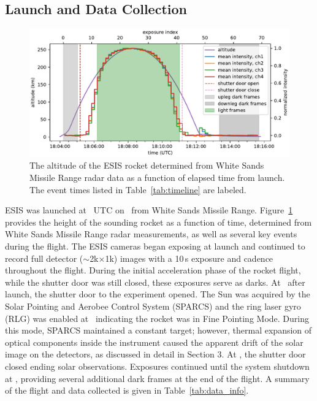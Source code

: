 	\subsection{Launch and Data Collection} 
		\begin{figure}[ht]
			\begin{center}
				\includegraphics{figures/signal_and_altitude_vs_time}
				\caption{The altitude of the ESIS rocket determined from White Sands Missile Range radar data as a function of elapsed time from launch.  The event times listed in Table~\ref{tab:timeline} are labeled.}
				\label{fig:timeline}
			\end{center}
		\end{figure}

		ESIS was launched at \timeMissionStart~UTC
		on \dateMission\ from White Sands Missile Range.  Figure~\ref{fig:timeline} provides the height of the sounding rocket as a function of time, determined from White Sands Missile Range radar measurements, as well as several key events during the flight.  
		The ESIS cameras began exposing at launch and continued to record full detector ($\sim$2k$\times$1k) images with a 10\,s exposure and cadence throughout the flight. During the initial acceleration phase of the rocket flight, while the shutter door was still closed, these exposures serve as darks.  
		At \timeMissionShutterOpen\ after launch, the shutter door to the experiment opened.  
		The Sun was acquired by the Solar Pointing and Aerobee Control System (SPARCS) and the ring laser gyro (RLG) was enabled at \timeMissionRlgEnable\ indicating the rocket was in Fine Pointing Mode.  
		During this mode, SPARCS maintained a constant target; however, thermal expansion of optical components inside the instrument caused the apparent drift of the solar image on the detectors, as discussed in detail in Section 3.  
		At  \timeMissionShutterClose, the shutter door closed ending solar observations. Exposures continued until the system shutdown at \timeDataStop, providing several additional dark frames at the end of the flight.   A summary of the flight and data collected is given in Table~\ref{tab:data_info}.
		
